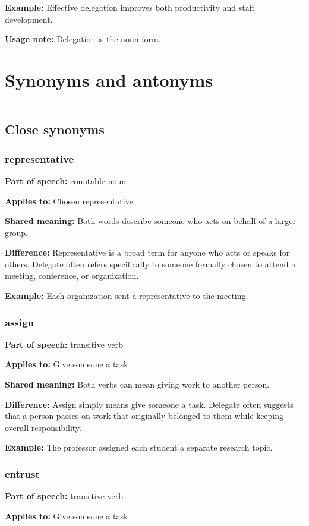 \documentclass[11pt]{article}
\newcommand{\sectionrule}{\par\vspace{-0.5em}\noindent\textcolor{Accent}{\rule{\linewidth}{0.6pt}}\par}
\begin{document}
\textbf{Example:} Effective delegation improves both productivity and staff development.

\textbf{Usage note:} Delegation is the noun form.

\section{Synonyms and antonyms}
\sectionrule
\subsection{Close synonyms}
\subsubsection{representative}
\textbf{Part of speech:} countable noun

\textbf{Applies to:} Chosen representative

\textbf{Shared meaning:} Both words describe someone who acts on behalf of a larger group.

\textbf{Difference:} Representative is a broad term for anyone who acts or speaks for others. Delegate often refers specifically to someone formally chosen to attend a meeting, conference, or organization.

\textbf{Example:} Each organization sent a representative to the meeting.

\subsubsection{assign}
\textbf{Part of speech:} transitive verb

\textbf{Applies to:} Give someone a task

\textbf{Shared meaning:} Both verbs can mean giving work to another person.

\textbf{Difference:} Assign simply means give someone a task. Delegate often suggests that a person passes on work that originally belonged to them while keeping overall responsibility.

\textbf{Example:} The professor assigned each student a separate research topic.

\subsubsection{entrust}
\textbf{Part of speech:} transitive verb

\textbf{Applies to:} Give someone a task
\end{document}
